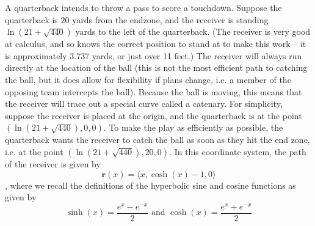\documentclass[12pt]{exam}
\begin{document}
\begin{questions}
\clearpage
\question A quarterback intends to throw a pass to score a touchdown. Suppose the quarterback is 20 yards from
	the endzone, and the receiver is standing $\ln (21 + \sqrt{440})$ yards to the left of the quarterback. (The
	receiver is very good at calculus, and so knows the correct position to stand at to make this work -- it is
	approximately 3.737 yards, or just over 11 feet.) The receiver will always run directly at the location of
	the ball (this is not the most efficient path to catching the ball, but it does allow for flexibility if plans
	change, i.e. a member of the opposing team intercepts the ball). Because the ball is moving, this means
	that the receiver will trace out a special curve called a catenary. For simplicity, suppose the receiver
	is placed at the origin, and the quarterback is at the point $(\ln (21 + \sqrt{440}) , 0, 0)$. To make the play
	as efficiently as possible, the quarterback wants the receiver to catch the ball as soon as they hit the
	end zone, i.e. at the point $(\ln (21 + \sqrt{440}) , 20, 0)$. In this coordinate system, the path of the receiver is given by
	\[ \mathbf{r}(x) = \langle x, \cosh(x) - 1, 0 \rangle \],
	where we recall the definitions of the hyperbolic sine and cosine functions as given by
	\[\sinh(x) = \frac{e^x-e^{-x}}{2} \text{ and } \cosh(x) = \frac{e^x + e^{-x}}{2}\]
	\begin{parts}

\end{parts}
\end{questions}
\end{document}
